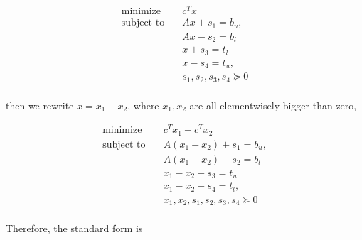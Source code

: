 \documentclass[a4paper]{article}
\begin{document}
\begin{equation}
\begin{split}\textrm{minimize} \quad  & c^Tx\\
\textrm{subject to} \quad & Ax+s_1=b_u, \\
& Ax-s_2=b_l\\
& x+s_3=t_l\\
& x-s_4=t_u,\\
&s_1,s_2,s_3,s_4\succeq 0\\
\end{split}
\end{equation}

then we rewrite $x = x_1 - x_2$, where $x_1, x_2$ are all elementwisely bigger than zero, 
 
\begin{equation}
\begin{split}\textrm{minimize} \quad  & c^Tx_1-c^Tx_2\\
\textrm{subject to} \quad & A(x_1-x_2)+s_1=b_u, \\
& A(x_1-x_2)-s_2=b_l\\
& x_1-x_2+s_3=t_u\\
& x_1-x_2-s_4=t_l,\\
&x_1,x_2,s_1,s_2,s_3,s_4\succeq 0\\
\end{split}
\end{equation}

Therefore, the standard form is
\end{document}
